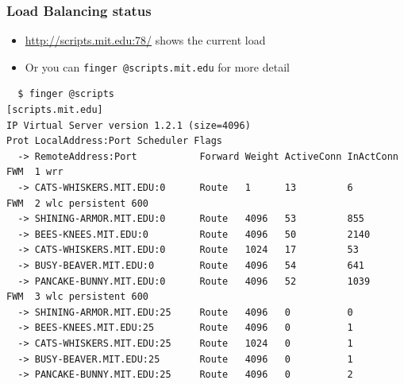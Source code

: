 \begin{frame}
  \frametitle{Load Balancing status}
  \begin{itemize}
  \item \url{http://scripts.mit.edu:78/} shows the current load
  \item Or you can \texttt{finger @scripts.mit.edu} for more detail
  \end{itemize}
\begin{verbatim}
  $ finger @scripts
[scripts.mit.edu]
IP Virtual Server version 1.2.1 (size=4096)
Prot LocalAddress:Port Scheduler Flags
  -> RemoteAddress:Port           Forward Weight ActiveConn InActConn
FWM  1 wrr
  -> CATS-WHISKERS.MIT.EDU:0      Route   1      13         6
FWM  2 wlc persistent 600
  -> SHINING-ARMOR.MIT.EDU:0      Route   4096   53         855
  -> BEES-KNEES.MIT.EDU:0         Route   4096   50         2140
  -> CATS-WHISKERS.MIT.EDU:0      Route   1024   17         53
  -> BUSY-BEAVER.MIT.EDU:0        Route   4096   54         641
  -> PANCAKE-BUNNY.MIT.EDU:0      Route   4096   52         1039
FWM  3 wlc persistent 600
  -> SHINING-ARMOR.MIT.EDU:25     Route   4096   0          0
  -> BEES-KNEES.MIT.EDU:25        Route   4096   0          1
  -> CATS-WHISKERS.MIT.EDU:25     Route   1024   0          1
  -> BUSY-BEAVER.MIT.EDU:25       Route   4096   0          1
  -> PANCAKE-BUNNY.MIT.EDU:25     Route   4096   0          2
\end{verbatim}
\end{frame}
